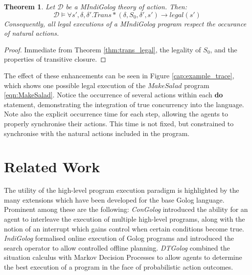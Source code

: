 \documentclass[letterpaper]{article}
\newtheorem{theorem}{Theorem}
\begin{document}
\begin{theorem}
Let $\mathcal{D}$ be a MIndiGolog theory of action. Then:
\begin{equation*}
\mathcal{D} \models \forall s',\delta,\delta'. Trans*(\delta,S_0,\delta',s')
\rightarrow legal(s')
\end{equation*}
Consequently, all legal executions of a MIndiGolog program respect
the occurance of natural actions.
\end{theorem}

\begin{proof}
Immediate from Theorem \ref{thm:trans_legal}, the legality of $S_0$, and
the properties of transitive closure.
\end{proof}

\begin{figure*}[t]
\centering
{}
\caption{One possible execution of the $MakeSalad$
program with three agents. Variables $\_ U$, $\_ T$, etc give
the occurrence times of each action, constrained to ensure all situations
are legal.}\label{cap:example_trace}
\end{figure*}

The effect of these enhancements can be seen in Figure
\ref{cap:example_trace}, which shows one possible legal execution of the
$MakeSalad$ program \ref{eqn:MakeSalad}. Notice the occurrence of several
actions within each \textbf{do} statement, demonstrating the integration
of true concurrency into the language.
Note also the explicit occurrence time for
each step, allowing the agents to properly synchronise their actions.
This time is not fixed, but constrained to synchronise with the natural
actions included in the program.

\section{Related Work}

The utility of the high-level program execution paradigm is highlighted
by the many extensions which have been developed for the base Golog
language. Prominent among these are the following: \emph{ConGolog}
\cite{giacomo00congolog} introduced the ability for an agent to interleave
the execution of multiple high-level programs, along with the notion
of an interrupt which gains control when certain conditions become
true. \emph{IndiGolog} \cite{giacomo99indigolog} formalised online
execution of Golog programs and introduced the search operator to
allow controlled offline planning. \emph{DTGolog} \cite{boutilier00dtgolog}
combined the situation calculus with Markov Decision Processes to
allow agents to determine the best execution of a program in the face
of probabilistic action outcomes.
\end{document}
